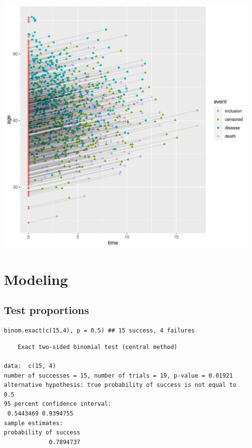 \documentclass{article}
\begin{document}
\begin{center}
\includegraphics[width=1\textwidth]{./figures/fig-gg-lexis.pdf}
\end{center}

\section{Modeling}
\label{sec:org467b615}
\subsection{Test proportions}
\label{sec:org5026744}
\lstset{language=r,label= ,caption= ,captionpos=b,numbers=none}
\begin{lstlisting}
binom.exact(c(15,4), p = 0.5) ## 15 success, 4 failures
\end{lstlisting}

\begin{verbatim}
	Exact two-sided binomial test (central method)

data:  c(15, 4)
number of successes = 15, number of trials = 19, p-value = 0.01921
alternative hypothesis: true probability of success is not equal to 0.5
95 percent confidence interval:
 0.5443469 0.9394755
sample estimates:
probability of success 
             0.7894737
\end{verbatim}
\end{document}
